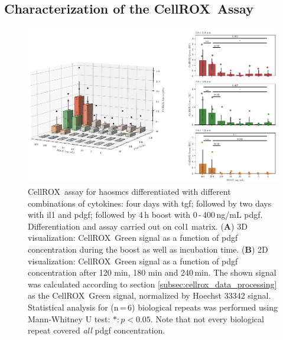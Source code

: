     \subsection{Characterization of the CellROX\texttrademark~Assay}
    \begin{figure}[h!]
    \capstart
        \centering
    	\includegraphics{Abbildung/CellROX_titration_no_norm.pdf}

    	\begin{minipage}{\captionwidth}
    		\caption[cellROX_titration]{ \newline
            CellROX\texttrademark~assay for \acp{haosmc} differentiated with different combinations of cytokines: four days with \ac{tgf}; followed by two days with \ac{il1} and \ac{pdgf}; followed by 4\,h boost with 0\,-\,400\,ng/mL \ac{pdgf}. Differentiation and assay carried out on \ac{col1} matrix.
            (\textbf{A}) 3D visualization: CellROX\texttrademark~Green signal as a function of \ac{pdgf} concentration during the boost as well as incubation time.
            (\textbf{B}) 2D visualization: CellROX\texttrademark~Green signal as a function of \ac{pdgf} concentration after 120 min, 180 min and 240\,min.
            The shown signal was calculated according to section \ref{subsec:cellrox_data_processing} as the CellROX\texttrademark~Green signal, normalized by Hoechst 33342 signal. Statistical analysis for (n\,=\,6) biological repeats was performed using Mann-Whitney U test: $*: p < 0.05$. Note that not every biological repeat covered \textit{all} \ac{pdgf} concentration. }
    		\label{fig:cellROX_titration}
    	\end{minipage}
    \end{figure}

